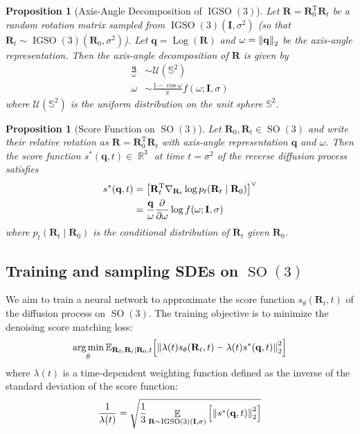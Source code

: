 \documentclass{article}
\theoremstyle{plain}
\newtheorem{proposition}[theorem]{Proposition}
\theoremstyle{definition}
\theoremstyle{remark}
\DeclareMathOperator{\SO}{SO}
\DeclareMathOperator{\IGSO}{IGSO}
\DeclareMathOperator{\Log}{\operatorname{Log}}
\DeclareMathOperator*{\argmin}{arg\,min}
\DeclareMathOperator{\R}{\mathbb{R}}
\DeclareMathOperator{\E}{\mathbb{E}}
\begin{document}
\begin{proposition}[Axis-Angle Decomposition of $\IGSO(3)$]\label{prop:axis_angle_decomposition}
    Let $\mathbf{R} = \mathbf{R}_0^\mathrm{T}\mathbf{R}_t$ be a random rotation matrix sampled from $\IGSO(3)(\mathbf{I}, \sigma^2)$ (so that $\mathbf{R}_{t} \sim \IGSO(3)(\mathbf{R}_0, \sigma^2)$). Let $\mathbf{q} = \Log(\mathbf{R})$ and $\omega = \norm{\mathbf{q}}_2$ be the axis-angle representation. Then the axis-angle decomposition of $\mathbf{R}$ is given by
    \begin{align}
        \frac{\mathbf{q}}{\omega} & \sim \mathcal{U}(\mathbb{S}^2)                             \\
        \omega                    & \sim \frac{1-\cos\omega}{\pi}f(\omega; \mathbf{I}, \sigma)
    \end{align}
    where $\mathcal{U}(\mathbb{S}^2)$ is the uniform distribution on the unit sphere $\mathbb{S}^2$.
\end{proposition}

\begin{proposition}[Score Function on $\SO(3)$]\label{prop:stein_score}
    Let $\mathbf{R}_0, \mathbf{R}_t\in\SO(3)$ and write their relative rotation as $\mathbf{R} = \mathbf{R}_0^\mathrm{T}\mathbf{R}_t$ with axis-angle representation $\mathbf{q}$ and $\omega$. Then the score function $s^*(\mathbf{q}, t) \in \R^3$ at time $t = \sigma^2$ of the reverse diffusion process satisfies
    \begin{equation}
        \begin{aligned}
            s^*(\mathbf{q}, t) & = \qty[\mathbf{R}_t^\mathrm{T} \nabla_{\mathbf{R}_t} \log p_t(\mathbf{R}_t\mid \mathbf{R}_0)]^\vee \\
                               & = \frac{\mathbf{q}}{\omega} \pdv{\omega} \log f(\omega; \mathbf{I}, \sigma)
        \end{aligned}
    \end{equation}
    where $p_t(\mathbf{R}_t\mid \mathbf{R}_0)$ is the conditional distribution of $\mathbf{R}_t$ given $\mathbf{R}_0$.
\end{proposition}

\subsection{Training and sampling SDEs on $\SO(3)$}

We aim to train a neural network to approximate the score function $s_\theta(\mathbf{R}_t, t)$ of the diffusion process on $\SO(3)$. The training objective is to minimize the denoising score matching loss:
\begin{equation}
    \argmin_\theta \mathbb{E}_{\mathbf{R}_0, \mathbf{R}_t\mid \mathbf{R}_0, t} \qty[\norm{\lambda(t) s_\theta(\mathbf{R}_t, t)-\lambda(t) s^*(\mathbf{q}, t)}^2_2]
\end{equation}
where $\lambda(t)$ is a time-dependent weighting function defined as the inverse of the standard deviation of the score function:
\begin{equation}
    \frac{1}{\lambda(t)} = \sqrt{\frac{1}{3}\E_{\mathbf{R}\sim \IGSO(3)(\mathbf{I}, \sigma)}\qty[\norm{s^*(\mathbf{q}, t)}_2^2]}
\end{equation}
\end{document}
